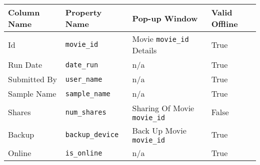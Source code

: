 \begin{tabularx}{\textwidth}{X|l|X|l}
\toprule
 Column Name   & Property Name   & Pop-up Window             & Valid Offline   \\
\midrule
 Id            & \texttt{movie\_id}        & Movie \texttt{movie\_id} Details    & True            \\
 Run Date      & \texttt{date\_run}        & n/a                       & True            \\
 Submitted By  & \texttt{user\_name}       & n/a                       & True            \\
 Sample Name   & \texttt{sample\_name}     & n/a                       & True            \\
 Shares        & \texttt{num\_shares}      & Sharing Of Movie \texttt{movie\_id} & False           \\
 Backup        & \texttt{backup\_device}   & Back Up Movie \texttt{movie\_id}    & True            \\
 Online        & \texttt{is\_online}       & n/a                       & True            \\
\bottomrule
\end{tabularx}